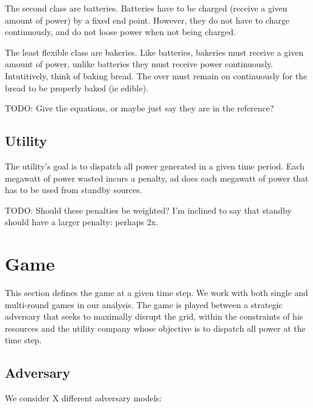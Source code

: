 \documentclass[conference]{IEEEtran}
\begin{document}
The second class are batteries.  Batteries have to be charged (receive a given amount of power) by a fixed end point.  However,
they do not have to charge continuously, and do not loose power when not being charged.

The least flexible class are bakeries.  Like batteries, bakeries must receive a given amount of power, unlike batteries they
must receive power continuously.  Intutitively, think of baking bread.  The over must remain on continuously for the bread
to be properly baked (ie edible).

TODO: Give the equations, or maybe just say they are in the reference?

\subsection{Utility}

The utility's goal is to dispatch all power generated in a given time period.  Each megawatt of power wasted incurs a penalty,
ad does each megawatt of power that has to be used from standby sources.

TODO: Should these penalties be weighted?  I'm inclined to say that standby should have a larger penalty: perhaps 2x.

\section{Game}

This section defines the game at a given time step.  We work with both single and multi-round games in our analysis.
The game is played between a strategic adversary that seeks to maximally disrupt the grid, within the constraints of his
resources and the utility company whose objective is to dispatch all power at the time step.   

\subsection{Adversary}

We consider X different adversary models:
\end{document}
